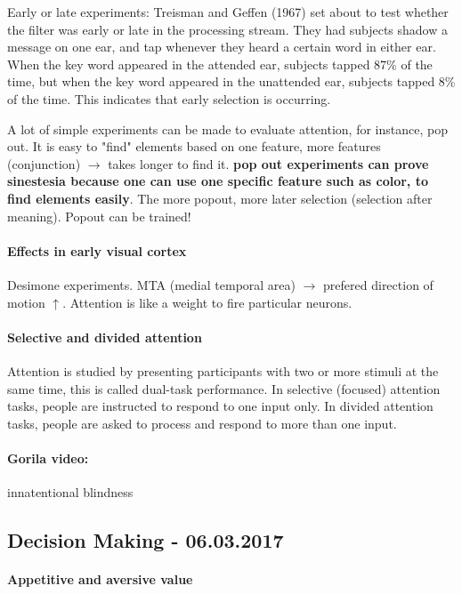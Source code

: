 \documentclass[12pt,article,oneside,a4paper]{memoir}
\begin{document}
Early or late experiments: Treisman and Geffen (1967) set about to test whether the filter was early or late in the processing stream. They had subjects shadow a message on one ear, and tap whenever they heard a certain word in either ear. When the key word appeared in the attended ear, subjects tapped 87\% of the time, but when the key word appeared in the unattended ear, subjects tapped 8\% of the time. This indicates that early selection is occurring.

A lot of simple experiments can be made to evaluate attention, for instance, pop out. It is easy to "find" elements based on one feature, more features (conjunction) $\rightarrow$ takes longer to find it. \textbf{pop out experiments can prove sinestesia because one can use one specific feature such as color, to find elements easily}. The more popout, more later selection (selection after meaning). Popout can be trained!

\paragraph{Effects in early visual cortex} Desimone experiments. MTA (medial temporal area) $\rightarrow$ prefered direction of motion $\uparrow$. Attention is like a weight to fire particular neurons.

\paragraph{Selective and divided attention} Attention is studied by presenting participants with two or more stimuli at the same time, this is called dual-task performance. In selective (focused) attention tasks, people are instructed to respond to one input only. In divided attention tasks, people are asked to process and respond to more than one input.

\paragraph{Gorila video:} innatentional blindness

\subsection{Decision Making - 06.03.2017}

\paragraph{Appetitive and aversive value}
\end{document}
